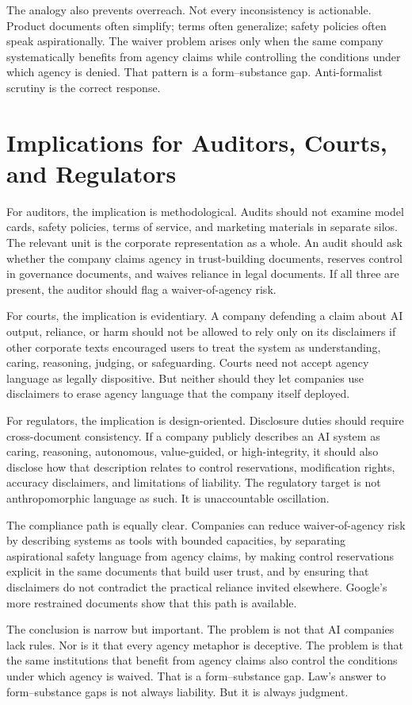 \documentclass[11pt,a4paper]{article}
\begin{document}
The analogy also prevents overreach. Not every inconsistency is actionable. Product documents often simplify; terms often generalize; safety policies often speak aspirationally. The waiver problem arises only when the same company systematically benefits from agency claims while controlling the conditions under which agency is denied. That pattern is a form--substance gap. Anti-formalist scrutiny is the correct response.

\section{Implications for Auditors, Courts, and Regulators}

For auditors, the implication is methodological. Audits should not examine model cards, safety policies, terms of service, and marketing materials in separate silos. The relevant unit is the corporate representation as a whole. An audit should ask whether the company claims agency in trust-building documents, reserves control in governance documents, and waives reliance in legal documents. If all three are present, the auditor should flag a waiver-of-agency risk.

For courts, the implication is evidentiary. A company defending a claim about AI output, reliance, or harm should not be allowed to rely only on its disclaimers if other corporate texts encouraged users to treat the system as understanding, caring, reasoning, judging, or safeguarding. Courts need not accept agency language as legally dispositive. But neither should they let companies use disclaimers to erase agency language that the company itself deployed.

For regulators, the implication is design-oriented. Disclosure duties should require cross-document consistency. If a company publicly describes an AI system as caring, reasoning, autonomous, value-guided, or high-integrity, it should also disclose how that description relates to control reservations, modification rights, accuracy disclaimers, and limitations of liability. The regulatory target is not anthropomorphic language as such. It is unaccountable oscillation.

The compliance path is equally clear. Companies can reduce waiver-of-agency risk by describing systems as tools with bounded capacities, by separating aspirational safety language from agency claims, by making control reservations explicit in the same documents that build user trust, and by ensuring that disclaimers do not contradict the practical reliance invited elsewhere. Google's more restrained documents show that this path is available.

The conclusion is narrow but important. The problem is not that AI companies lack rules. Nor is it that every agency metaphor is deceptive. The problem is that the same institutions that benefit from agency claims also control the conditions under which agency is waived. That is a form--substance gap. Law's answer to form--substance gaps is not always liability. But it is always judgment.



\end{document}
